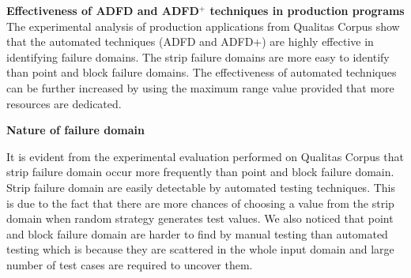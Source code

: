 \textbf{Effectiveness of ADFD and ADFD$^+$ techniques in production programs}
The experimental analysis of production applications from Qualitas Corpus show that the automated techniques (ADFD and ADFD+) are highly effective in identifying failure domains. The strip failure domains are more easy to identify than point and block failure domains. The effectiveness of automated techniques can be further increased by using the maximum range value provided that more resources are dedicated.


\textbf{Nature of failure domain}

It is evident from the experimental evaluation performed on Qualitas Corpus that strip failure domain occur more frequently than point and block failure domain. Strip failure domain are easily detectable by automated testing techniques. This is due to the fact that there are more chances of choosing a value from the strip domain when random strategy generates test values. We also noticed that point and block failure domain are harder to find by manual testing than automated testing which is because they are scattered in the whole input domain and large number of test cases are required to uncover them. 





